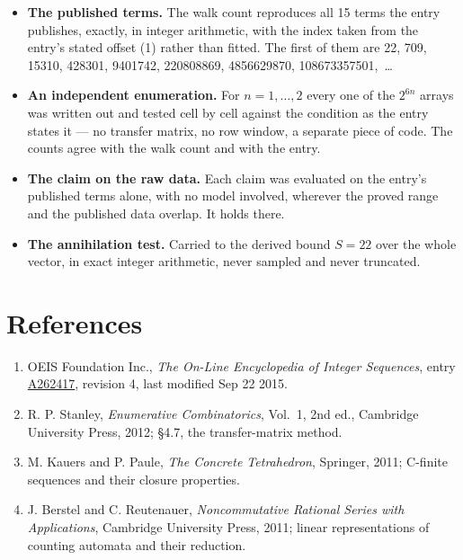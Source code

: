 \documentclass[11pt]{article}
\theoremstyle{definition}
\begin{document}
\begin{itemize}

\item {\bfseries The published terms.} The walk count reproduces all 15 terms the entry publishes, exactly, in integer arithmetic, with the index taken from the entry's stated offset (1) rather than fitted. The first of them are 22, 709, 15310, 428301, 9401742, 220808869, 4856629870, 108673357501,~\dots

\item {\bfseries An independent enumeration.} For $n = 1,\dots,2$ every one of the $2^{6n}$ arrays was written out and tested cell by cell against the condition as the entry states it --- no transfer matrix, no row window, a separate piece of code. The counts agree with the walk count and with the entry.

\item {\bfseries The claim on the raw data.} Each claim was evaluated on the entry's published terms alone, with no model involved, wherever the proved range and the published data overlap. It holds there.

\item {\bfseries The annihilation test.} Carried to the derived bound $S = 22$ over the whole vector, in exact integer arithmetic, never sampled and never truncated.

\end{itemize}

\section{References}

\begin{enumerate}

\item OEIS Foundation Inc., \emph{The On-Line Encyclopedia of Integer Sequences}, entry \href{https://oeis.org/A262417}{A262417}, revision 4, last modified Sep 22 2015.

\item R. P. Stanley, \emph{Enumerative Combinatorics}, Vol.~1, 2nd ed., Cambridge University Press, 2012; \S4.7, the transfer-matrix method.

\item M. Kauers and P. Paule, \emph{The Concrete Tetrahedron}, Springer, 2011; C-finite sequences and their closure properties.

\item J. Berstel and C. Reutenauer, \emph{Noncommutative Rational Series with Applications}, Cambridge University Press, 2011; linear representations of counting automata and their reduction.

\end{enumerate}
\end{document}
